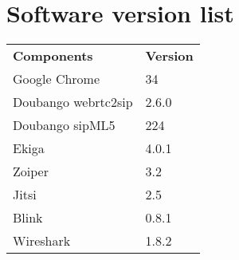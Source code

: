 \chapter{Software version list}

\begin{table}[h]
\begin{tabular}{ll}
\textbf{Components} & \textbf{Version} \\
Google Chrome       & 34               \\
Doubango webrtc2sip & 2.6.0            \\
Doubango sipML5     & 224              \\
Ekiga               & 4.0.1            \\
Zoiper              & 3.2              \\
Jitsi               & 2.5              \\
Blink               & 0.8.1            \\
Wireshark 					& 1.8.2
\end{tabular}
\end{table}